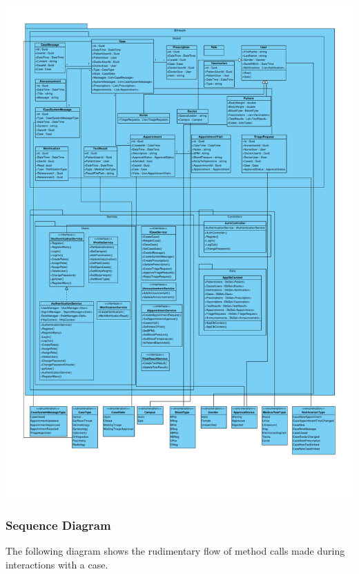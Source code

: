 \documentclass[a4paper, 12pt, titlepage]{article}
\begin{document}
  \includegraphics[width=\linewidth]{class_diag}

  \subsubsection{Sequence Diagram}
  
  The following diagram shows the rudimentary flow of method calls made during interactions with a case.
  
\end{document}
